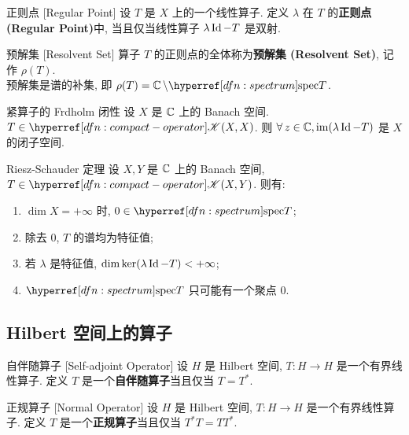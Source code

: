         \begin{dfn}
            {正则点}
            [Regular Point]
            设 \(T\) 是 \(X\) 上的一个线性算子. 定义 \(\lambda\) 在 \(T\) 的\textbf{正则点 (Regular Point)}中, 当且仅当线性算子 \(\lambda\operatorname{Id}-T\) 是双射.
        \end{dfn}

        \begin{dfn}
            {预解集}
            [Resolvent Set]
            算子 \(T\) 的正则点的全体称为\textbf{预解集 (Resolvent Set)}, 记作 \(\rho(T)\).\\
            预解集是谱的补集, 即 \(\rho(T)=\C\setminus\spec T\).
        \end{dfn}

        \begin{thm}
            {紧算子的 Frdholm 闭性}
            设 \(X\) 是 \(\operatorname{\mathbb{C}}\) 上的 Banach 空间. \(T\in\cpt(X,X)\). 则 \(\forall\,z\in\operatorname{\mathbb{C}}, \operatorname{im}(\lambda\operatorname{Id}-T)\) 是 \(X\) 的闭子空间.
        \end{thm}

        \begin{thm}
            {Riesz-Schauder 定理}
            设 \(X,Y\) 是 \(\operatorname{\mathbb{C}}\) 上的 Banach 空间, \(T\in\cpt(X,Y)\). 则有:
            \begin{enumerate}
                \item \(\dim X=+\infty\) 时, \(0\in\spec T\);
                \item 除去 \(0\), \(T\) 的谱均为特征值;
                \item 若 \(\lambda\) 是特征值, \(\dim\ker(\lambda\operatorname{Id}-T)<+\infty\);
                \item \(\spec T\) 只可能有一个聚点 \(0\).
            \end{enumerate}
        \end{thm}

    \subsection{Hilbert 空间上的算子}

        \begin{dfn}
            {自伴随算子}
            [Self-adjoint Operator]
            设 $H$ 是 Hilbert 空间, $T: H \to H$ 是一个有界线性算子. 定义 $T$ 是一个\textbf{自伴随算子}当且仅当 \(T=T^*\).
        \end{dfn}

        \begin{dfn}
            {正规算子}
            [Normal Operator]
            设 $H$ 是 Hilbert 空间, $T: H \to H$ 是一个有界线性算子. 定义 $T$ 是一个\textbf{正规算子}当且仅当 \(T^* T = T T^*\).
        \end{dfn}

